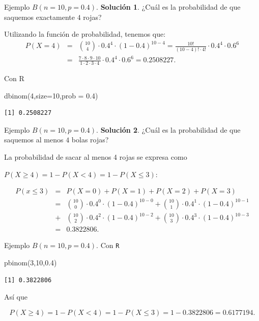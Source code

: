 \documentclass[
  ignorenonframetext,
  aspectratio=169]{beamer}
\newenvironment{Shaded}{\begin{snugshade}}{\end{snugshade}}
\newcommand{\AttributeTok}[1]{\textcolor[rgb]{0.40,0.45,0.13}{#1}}
\newcommand{\DecValTok}[1]{\textcolor[rgb]{0.68,0.00,0.00}{#1}}
\newcommand{\FloatTok}[1]{\textcolor[rgb]{0.68,0.00,0.00}{#1}}
\newcommand{\FunctionTok}[1]{\textcolor[rgb]{0.28,0.35,0.67}{#1}}
\newcommand{\NormalTok}[1]{\textcolor[rgb]{0.00,0.23,0.31}{#1}}
\begin{document}
\begin{frame}[fragile]{Ejemplo \(B(n=10,p=0.4).\)}
\protect\hypertarget{ejemplo-bn10p0.4.-1}{}
\textbf{Solución 1}. ¿Cuál es la probabilidad de que saquemos
exactamente \(4\) rojas?

Utilizando la función de probabilidad, tenemos que: \begin{eqnarray*}
P(X=4)&=&{10\choose 4}\cdot 0.4^4\cdot (1-0.4)^{10-4}
= \frac{10!}{(10-4)!\cdot 4!}\cdot 0.4^4\cdot 0.6^6\\
&=& \frac{7\cdot 8\cdot 9\cdot 10}{1\cdot 2\cdot 3\cdot 4}\cdot 0.4^4\cdot 0.6^6=0.2508227.
\end{eqnarray*}

Con R

\begin{Shaded}
\begin{Highlighting}[]
\FunctionTok{dbinom}\NormalTok{(}\DecValTok{4}\NormalTok{,}\AttributeTok{size=}\DecValTok{10}\NormalTok{,}\AttributeTok{prob =} \FloatTok{0.4}\NormalTok{)}
\end{Highlighting}
\end{Shaded}

\begin{verbatim}
[1] 0.2508227
\end{verbatim}
\end{frame}

\begin{frame}{Ejemplo \(B(n=10,p=0.4).\)}
\protect\hypertarget{ejemplo-bn10p0.4.-2}{}
\textbf{Solución 2}. ¿Cuál es la probabilidad de que saquemos al menos
\(4\) bolas rojas?

La probabilidad de sacar al menos 4 rojas se expresa como

\(P(X \geq 4)=1-P(X<4)=1-P(X\leq 3):\)

\begin{eqnarray*}
P(x\leq 3)&=& P(X=0)+P(X=1)+P(X=2)+P(X=3)\\
&=& 
 {10\choose 0}\cdot 0.4^0\cdot (1-0.4)^{10-0}+ {10\choose 1}\cdot 0.4^1\cdot (1-0.4)^{10-1}\\
&+&{10\choose 2}\cdot 0.4^2\cdot (1-0.4)^{10-2}+ {10\choose 3}\cdot 0.4^3\cdot (1-0.4)^{10-3}\\
&=&0.3822806.
\end{eqnarray*}
\end{frame}

\begin{frame}[fragile]{Ejemplo \(B(n=10,p=0.4).\)}
\protect\hypertarget{ejemplo-bn10p0.4.-3}{}
Con \texttt{R}

\begin{Shaded}
\begin{Highlighting}[]
\FunctionTok{pbinom}\NormalTok{(}\DecValTok{3}\NormalTok{,}\DecValTok{10}\NormalTok{,}\FloatTok{0.4}\NormalTok{)}
\end{Highlighting}
\end{Shaded}

\begin{verbatim}
[1] 0.3822806
\end{verbatim}

Así que

\[P(X \geq 4 )=1-P(X< 4)=1-P(X\leq 3)=1-0.3822806=0.6177194.\]
\end{frame}
\end{document}
